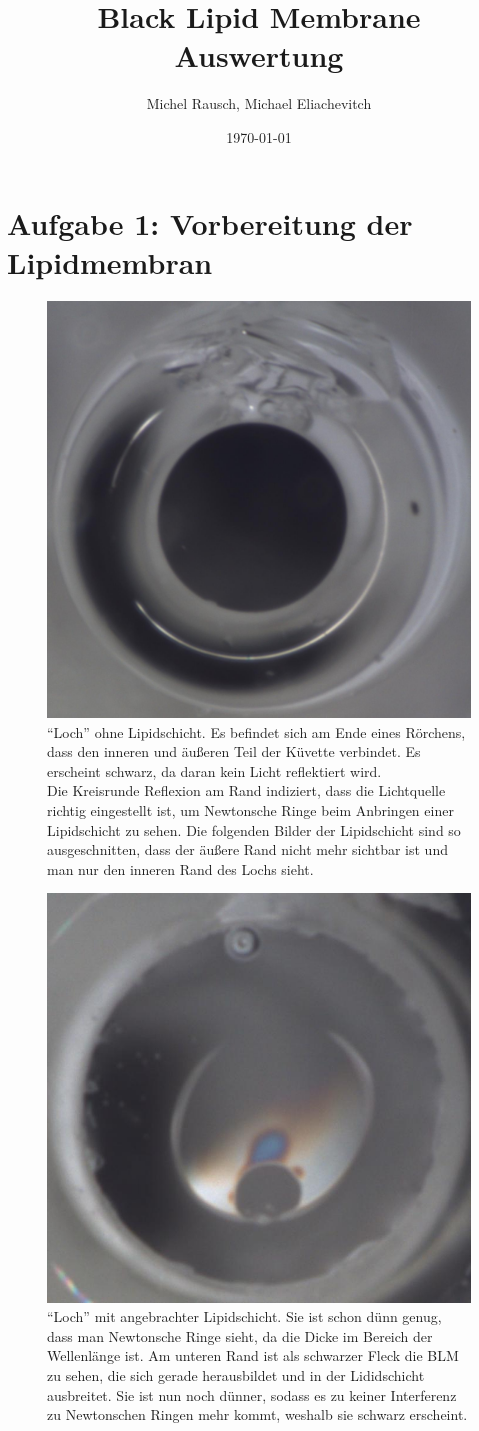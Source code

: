 \documentclass[a4paper,ngerman]{scrartcl}
\title{Black Lipid Membrane\\ Auswertung}
\date{\today}
\author{Michel Rausch, Michael Eliachevitch}
\begin{document}
\maketitle
\tableofcontents
\newpage

\section{Aufgabe 1: Vorbereitung der Lipidmembran}

\begin{figure}[tbh!]
  \centering
  \includegraphics[width=.4\textwidth]{abbildungen/ohnelipidschicht_cut.jpg}
  \caption{"`Loch"' ohne Lipidschicht. Es befindet sich am Ende eines Rörchens, dass den inneren und äußeren Teil der Küvette verbindet.
Es erscheint schwarz, da daran kein Licht reflektiert wird.\\
Die Kreisrunde Reflexion am Rand indiziert, dass die Lichtquelle richtig eingestellt ist, um Newtonsche Ringe beim Anbringen einer
Lipidschicht zu sehen. Die folgenden Bilder der Lipidschicht sind so ausgeschnitten, dass der äußere Rand nicht mehr sichtbar ist und man nur den inneren Rand des Lochs sieht.}
  \label{fig:loch}
\end{figure}

\begin{figure}[tbh!]
  \centering
  \includegraphics[width=.4\textwidth]{abbildungen/newton2_cut.jpg}
  \caption{"`Loch"' mit angebrachter Lipidschicht. Sie ist schon dünn genug, dass man Newtonsche Ringe sieht, da die Dicke im Bereich der Wellenlänge ist. Am unteren Rand ist als schwarzer Fleck die BLM zu sehen, die sich gerade herausbildet und in der Lididschicht ausbreitet.
Sie ist nun noch dünner, sodass es zu keiner Interferenz zu Newtonschen Ringen mehr kommt, weshalb sie schwarz erscheint.}
  \label{fig:loch}
\end{figure}
\end{document}

